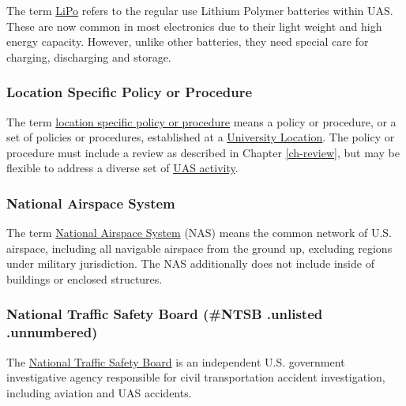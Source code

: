 \documentclass[
]{book}
\begin{document}
The term \protect\hyperlink{LiPo}{LiPo} refers to the regular use Lithium Polymer batteries within UAS. These are now common in most electronics due to their light weight and high energy capacity. However, unlike other batteries, they need special care for charging, discharging and storage.



\hypertarget{LSP}{%
\subsubsection*{Location Specific Policy or Procedure}\label{LSP}}

The term \protect\hyperlink{LSP}{location specific policy or procedure} means a policy or procedure, or a set of policies or procedures, established at a \protect\hyperlink{UL}{University Location}. The policy or procedure must include a review as described in Chapter \ref{ch-review}, but may be flexible to address a diverse set of \protect\hyperlink{UASactivity}{UAS activity}.





\hypertarget{NAS}{%
\subsubsection*{National Airspace System}\label{NAS}}

The term \protect\hyperlink{NAS}{National Airspace System} (NAS) means the common network of U.S. airspace, including all navigable airspace from the ground up, excluding regions under military jurisdiction. The NAS additionally does not include inside of buildings or enclosed structures.





\hypertarget{national-traffic-safety-board-ntsb-.unlisted-.unnumbered}{%
\subsubsection{National Traffic Safety Board (\#NTSB .unlisted .unnumbered)}\label{national-traffic-safety-board-ntsb-.unlisted-.unnumbered}}

The \protect\hyperlink{NTSB}{National Traffic Safety Board} is an independent U.S. government investigative agency responsible for civil transportation accident investigation, including aviation and UAS accidents.
\end{document}
